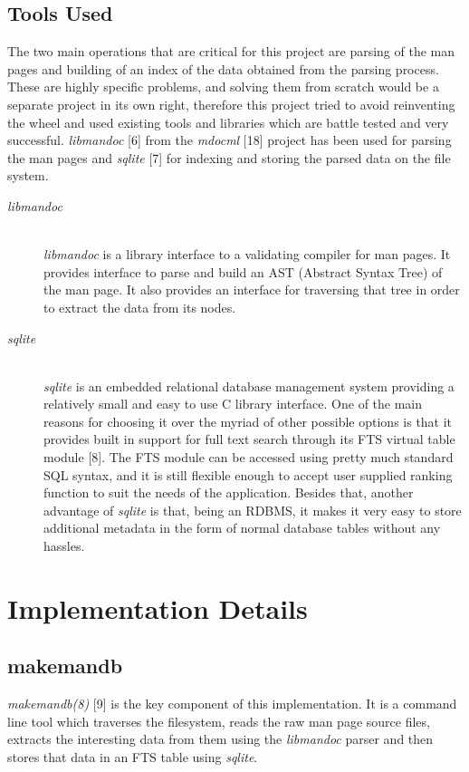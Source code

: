 \documentclass[letterpaper,twocolumn,10pt]{article}
\begin{document}
\subsection{Tools Used}
The two main operations that are critical for this project are parsing of the
man pages and building of an index of the
data obtained from the parsing process. These are highly specific problems, and
solving them from scratch would be a separate project in its own right,
therefore this project tried to avoid reinventing the wheel and used existing
tools and libraries which are battle tested and very successful.
\textit{libmandoc} [6] from the \textit{mdocml} [18] project has been used for
parsing the man pages and \textit{sqlite} [7] for indexing and storing the parsed
data on the file system.

\begin{description}
\item[\textit{libmandoc}] \hfill \\
\textit{libmandoc} is a library interface to a validating compiler for man pages. It provides
interface to parse and build an AST (Abstract Syntax Tree) of the man page. It
also provides an interface for traversing that tree in order to extract the data
from its nodes.
\end{description}

\begin{description}
\item[\textit{sqlite}] \hfill \\
\textit{sqlite} is an embedded relational database management system providing a
relatively small and easy to use C library interface. One of the main reasons
for choosing it over the myriad of other possible options is that it provides
built in support for full text search through its FTS virtual table module [8].
The FTS module can be accessed using pretty much standard SQL syntax, and it is
still flexible enough to accept user supplied ranking function to suit the needs
of the application. Besides that, another advantage of \textit{sqlite} is that, 
being an RDBMS, it makes it very easy to store additional metadata in the form
of normal database tables without any hassles.
\end{description}

\section{Implementation Details}

\subsection{makemandb}
\textit{makemandb(8)} [9] is the key component of this implementation. It is a
command line tool which traverses the filesystem, reads the raw man page source files, extracts the interesting data from them using the \textit{libmandoc} parser and then stores that data in an FTS table using \textit{sqlite}. \\
\end{document}
